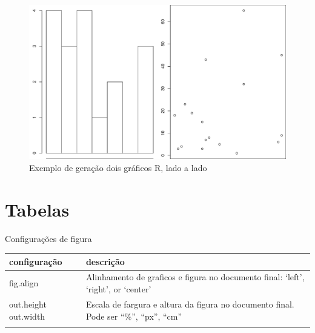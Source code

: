 \documentclass[
	12pt,				%
	oneside,			%
	a4paper,			%
	english,			%
	french,				%
	spanish,			%
	brazil				%
	]{abntex2}
\def\toprule{\hlineB{3}} %
\def\midrule{\hline}
\def\bottomrule{\hlineB{3}} %
\begin{document}
\begin{figure}[htbp]
\hypertarget{doisgraficos}{%
\caption{Exemplo de geração dois gráficos R, lado a lado}\label{doisgraficos}
\begin{center}
\includegraphics[scale=0.4]{imagens/R/dois-graficos.pdf}
\end{center}
}
\end{figure}

\hypertarget{tabelas}{%
\section{Tabelas}\label{tabelas}}

Configurações de figura

\begin{longtable}[]{@{}ll@{}}
\toprule
\begin{minipage}[b]{0.47\columnwidth}\raggedright
configuração\strut
\end{minipage} & \begin{minipage}[b]{0.47\columnwidth}\raggedright
descrição\strut
\end{minipage}\tabularnewline
\midrule
\endhead
\begin{minipage}[t]{0.47\columnwidth}\raggedright
fig.align\strut
\end{minipage} & \begin{minipage}[t]{0.47\columnwidth}\raggedright
Alinhamento de graficos e figura no documento final: `left', `right', or
`center'\strut
\end{minipage}\tabularnewline
\begin{minipage}[t]{0.47\columnwidth}\raggedright
out.height out.width\strut
\end{minipage} & \begin{minipage}[t]{0.47\columnwidth}\raggedright
Escala de fargura e altura da figura no documento final. Pode ser
``\%'', ``px'', ``cm''\strut
\end{minipage}\tabularnewline
\bottomrule
\end{longtable}
\end{document}

